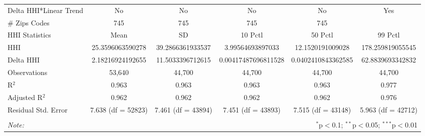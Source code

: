 \begin{table}[H]
{\begin{tabular}{@{\extracolsep{5pt}}lccccc}
 Delta HHI*Linear Trend & No & No & No & No & Yes \\  

 # Zips Codes & 745 & 745 & 745 & 745 &  \\  

 HHI Statistics & Mean & SD & 10 Pctl & 50 Pctl & 99 Pctl \\  

 HHI & 25.3596063590278 & 39.2866361933537 & 3.99564693897033 & 12.1520191009028 & 178.259819055545 \\  

 Delta HHI & 2.18216924192655 & 11.5033396712615 & 0.00417487696811528 & 0.0402410843362585 & 62.8839693342832 \\  

 Observations & 53,640 & 44,700 & 44,700 & 44,700 & 44,700 \\  

 R$^{2}$ & 0.963 & 0.963 & 0.963 & 0.963 & 0.977 \\  

 Adjusted R$^{2}$ & 0.962 & 0.962 & 0.962 & 0.962 & 0.976 \\  

 Residual Std. Error & 7.638 (df = 52823) & 7.461 (df = 43894) & 7.451 (df = 43893) & 7.515 (df = 43148) & 5.963 (df = 42712) \\  

 \hline  

 \hline \\[-1.8ex]  

 \textit{Note:}  & \multicolumn{5}{r}{$^{*}$p$<$0.1; $^{**}$p$<$0.05; $^{***}$p$<$0.01} \\  

 \end{tabular}}  

 \end{table}  

 



